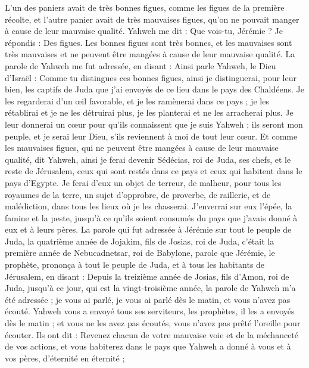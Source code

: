 \begin{multicols}{2}
L'un des paniers avait de très bonnes figues, comme les figues de la première récolte, et l'autre panier avait de très mauvaises figues, qu’on ne pouvait manger à cause de leur mauvaise qualité.
Yahweh me dit : Que vois-tu, Jérémie ? Je répondis : Des figues. Les bonnes figues sont très bonnes, et les mauvaises sont très mauvaises et ne peuvent être mangées à cause de leur mauvaise qualité.
La parole de Yahweh me fut adressée, en disant :
Ainsi parle Yahweh, le Dieu d'Israël : Comme tu distingues ces bonnes figues, ainsi je distinguerai, pour leur bien, les captifs de Juda que j'ai envoyés de ce lieu dans le pays des Chaldéens.
Je les regarderai d’un œil favorable, et je les ramènerai dans ce pays ; je les rétablirai et je ne les détruirai plus, je les planterai et ne les arracherai plus.
Je leur donnerai un cœur pour qu’ils connaissent que je suis Yahweh ; ils seront mon peuple, et je serai leur Dieu, s’ils reviennent à moi de tout leur cœur.
Et comme les mauvaises figues, qui ne peuvent être mangées à cause de leur mauvaise qualité, dit Yahweh, ainsi je ferai devenir Sédécias, roi de Juda, ses chefs, et le reste de Jérusalem, ceux qui sont restés dans ce pays et ceux qui habitent dans le pays d'Egypte.
Je ferai d’eux un objet de terreur, de malheur, pour tous les royaumes de la terre, un sujet d’opprobre, de proverbe, de raillerie, et de malédiction, dans tous les lieux où je les chasserai.
J'enverrai sur eux l'épée, la famine et la peste, jusqu’à ce qu'ils soient consumés du pays que j’avais donné à eux et à leurs pères.
\VerseOne{}La parole qui fut adressée à Jérémie sur tout le peuple de Juda, la quatrième année de Jojakim, fils de Josias, roi de Juda, c’était la première année de Nebucadnetsar, roi de Babylone,
parole que Jérémie, le prophète, prononça à tout le peuple de Juda, et à tous les habitants de Jérusalem, en disant :
Depuis la treizième année de Josias, fils d'Amon, roi de Juda, jusqu’à ce jour, qui est la vingt-troisième année, la parole de Yahweh m'a été adressée ; je vous ai parlé, je vous ai parlé dès le matin, et vous n'avez pas écouté.
Yahweh vous a envoyé tous ses serviteurs, les prophètes, il les a envoyés dès le matin ; et vous ne les avez pas écoutés, vous n'avez pas prêté l’oreille pour écouter.
Ils ont dit : Revenez chacun de votre mauvaise voie et de la méchanceté de vos actions, et vous habiterez dans le pays que Yahweh a donné à vous et à vos pères, d’éternité en éternité ;

\end{multicols}

